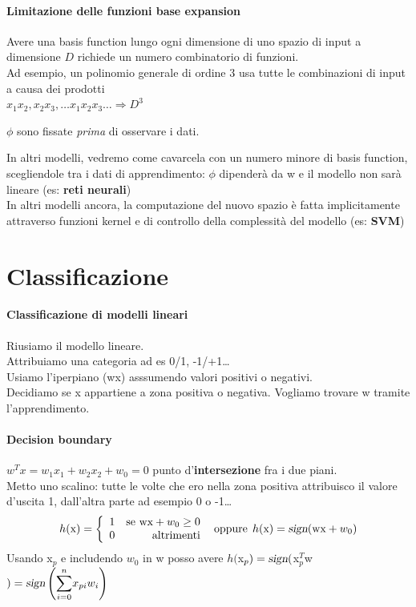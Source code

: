\documentclass[10pt]{book}
\begin{document}
\paragraph{Limitazione delle funzioni base expansion}
\begin{list}{}{}
	\item Avere una basis function lungo ogni dimensione di uno spazio di input a dimensione $D$ richiede un numero combinatorio di funzioni.\\
	Ad esempio, un polinomio generale di ordine 3 usa tutte le combinazioni di input a causa dei prodotti\\$x_1x_2, x_2x_3,\ldots x_1x_2x_3\ldots \Rightarrow D^3$
	\item $\phi$ sono fissate \textit{prima} di osservare i dati.
\end{list}
In altri modelli, vedremo come cavarcela con un numero minore di basis function, scegliendole tra i dati di apprendimento: $\phi$ dipenderà da w e il modello non sarà lineare (es: \textbf{reti neurali})\\
In altri modelli ancora, la computazione del nuovo spazio è fatta implicitamente attraverso funzioni kernel e di controllo della complessità del modello (es: \textbf{SVM})
\section{Classificazione}
\paragraph{Classificazione di modelli lineari} Riusiamo il modello lineare.\\ Attribuiamo una categoria ad es 0/1, -1/+1\ldots\\
Usiamo l'iperpiano (wx) asssumendo valori positivi o negativi.\\
Decidiamo se x appartiene a zona positiva o negativa. Vogliamo trovare w tramite l'apprendimento.
\paragraph{Decision boundary} $w^T x = w_1x_1 + w_2x_2 + w_0 = 0$ punto d'\textbf{intersezione} fra i due piani.\\
Metto uno scalino: tutte le volte che ero nella zona positiva attribuisco il valore d'uscita 1, dall'altra parte ad esempio 0 o -1\ldots
$$h(\text{x}) = \left\{ \begin{array}{l r}
1 & \text{se wx} + w_0 \geq 0\\
0 & \text{altrimenti}
\end{array} \right. \:\:\text{oppure}\:\:h(\text{x}) = \textsl{sign}(\text{wx} + w_0)$$
Usando x$_p$ e includendo $w_0$ in w posso avere $h($x$_p) = \textsl{sign}($x$_p^T$w$) = \textsl{sign}\left(\mathlarger{\sum_{i=0}^n} x_{pi}w_i\right)$
\end{document}
